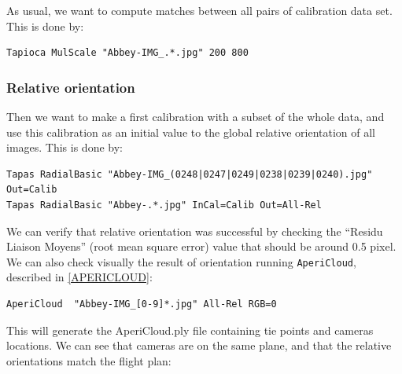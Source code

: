 As usual, we want to compute matches between all pairs of calibration data set. This is done by:

\begin{verbatim}
Tapioca MulScale "Abbey-IMG_.*.jpg" 200 800
\end{verbatim}

	
\subsubsection{Relative orientation}

Then we want to make a first calibration with a subset of the whole data, and
use this calibration as an initial value to the global relative orientation of all images. This is done by:

\begin{verbatim}
Tapas RadialBasic "Abbey-IMG_(0248|0247|0249|0238|0239|0240).jpg" Out=Calib
Tapas RadialBasic "Abbey-.*.jpg" InCal=Calib Out=All-Rel
\end{verbatim}

We can verify that relative orientation was successful by checking the ``Residu Liaison Moyens'' (root mean square error) value that should be around 0.5 pixel.
We can also check visually the result of orientation running {\tt AperiCloud}, described in \ref{APERICLOUD}: 

\begin{verbatim}
AperiCloud  "Abbey-IMG_[0-9]*.jpg" All-Rel RGB=0
\end{verbatim}

This will generate the AperiCloud.ply file containing tie points and cameras locations. We can see that cameras are on the same plane, and that the relative orientations match the flight
plan:

